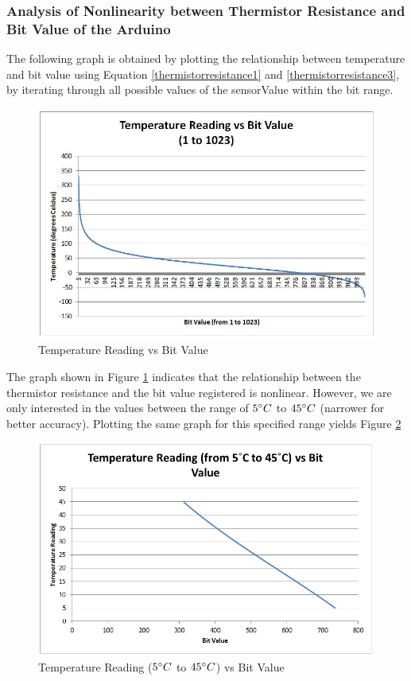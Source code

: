 \subsubsection{Analysis of Nonlinearity between Thermistor Resistance and Bit Value of the Arduino}

The following graph is obtained by plotting the relationship between temperature and bit value using Equation \ref{thermistorresistance1} and \ref{thermistorresistance3}, by iterating through all possible values of the sensorValue within the bit range.

\begin{figure}[H]
	\centering
	\includegraphics[width=0.8\linewidth]{thermistor2.jpg}
	\caption{Temperature Reading vs Bit Value}
	\label{temperaturevsbitvalue}
\end{figure}

The graph shown in Figure \ref{temperaturevsbitvalue} indicates that the relationship between the thermistor resistance and the bit value registered is nonlinear. However, we are only interested in the values between the range of $5\degree C$ to $45\degree C$ (narrower for better accuracy). Plotting the same graph for this specified range yields Figure \ref{temperaturevsbitvalue5-45} 

\begin{figure}[H]
	\centering
	\includegraphics[width=0.8\linewidth]{thermistor3.jpg}
	\caption{Temperature Reading ($5\degree C$ to $45\degree C$) vs Bit Value}
	\label{temperaturevsbitvalue5-45}
\end{figure}

